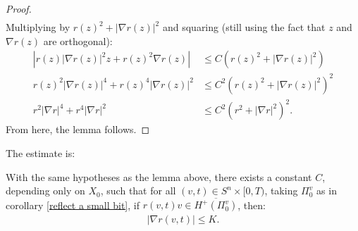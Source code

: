\begin{proof}
\begin{align*}
	\end{align*}
	Multiplying by $r(z)^2  + |\nabla r(z)|^2$ and squaring (still using the fact that $z$ and $\nabla r(z)$ are orthogonal):
	\begin{align*}
		\left\vert r(z)|\nabla r(z)|^2z  + r(z)^2 \nabla r(z) \right\vert &\leq C (r(z)^2  + |\nabla r(z)|^2)\\
		r(z)^2|\nabla r(z)|^4  + r(z)^4 |\nabla r(z)|^2  &\leq C^2 (r(z)^2  + |\nabla r(z)|^2)^2\\
		r^2 |\nabla r|^4 + r^4 |\nabla r|^2 &\leq C^2 (r^2 + |\nabla r|^2)^2.
	\end{align*}
	From here, the lemma follows.
\end{proof}

The estimate is:

\begin{proposition}
	With the same hypotheses as the lemma above, there exists a constant $ C $, depending only on $ X_0 $, such that for all $ (v, t) \in S^n \times [0, T) $, taking $\Pi_0^v$ as in corollary \ref{reflect a small bit}, if $ r(v, t) v \in \overline{H^+(\Pi_0^v)} $, then:
	\begin{align*}
		| \nabla r(v, t) | \leq K.
	\end{align*}
\end{proposition}

